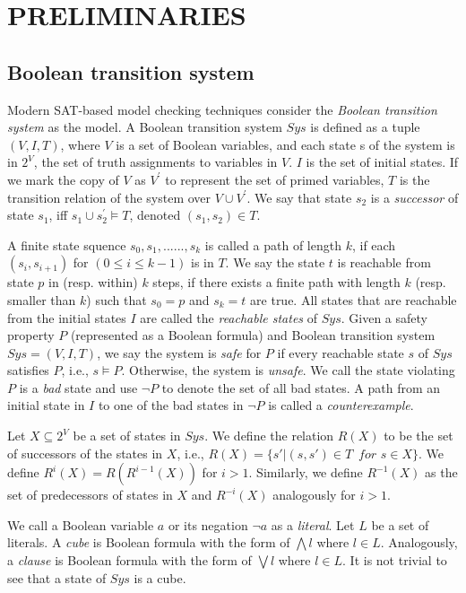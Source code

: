 \section{PRELIMINARIES}

\subsection{Boolean transition system}

Modern SAT-based model checking techniques consider the \emph{Boolean transition system} as the model. A Boolean transition system $Sys$ is defined as a tuple $(V,I,T)$, where $V$ is a set of Boolean variables, and each state s of the system is in $2^{V}$, the set of truth assignments to variables in $V$. $I$ is the set of initial states. If we mark the copy of $V$ as $V^{'}$ to represent the set of primed variables, $T$ is the transition relation of the system over $V \cup V^{'}$. We say that state $s_{2}$ is a \textit{successor} of state $s_{1}$, iff $s_{1} \cup s^{'}_{2} \models T$, denoted $(s_{1},s_{2}) \in T$.


A finite state squence $s_{0},s_{1},......,s_{k}$ is called a path of length $k$, if each $(s_{i},s_{i+1})$ for $(0 \leq i \leq k-1)$ is in $T$. We say the state $t$ is reachable from state $p$ in (resp. within) $k$ steps, if there exists a finite path with length $k$ (resp. smaller than $k$) such that $s_{0} = p$ and $s_{k} = t$ are true. All states that are reachable from the initial states $I$ are called the \emph{reachable states} of $Sys$.
Given a safety property $P$ (represented as a Boolean formula) and Boolean transition system $Sys = (V,I,T)$, we say the system is \emph{safe} for $P$ if every reachable state $s$ of $Sys$ satisfies $P$, i.e., $s\models P$. Otherwise, the system is \emph{unsafe}. We call the state violating $P$ is a \emph{bad} state and use $\neg P$ to denote the set of all bad states. A path from an initial state in $I$ to one of the bad states in $\neg P$ is called a \emph{counterexample}.

Let $X \subseteq 2^{V}$ be a set of states in $Sys$. We define the relation $R(X)$ to be the set of successors of the states in $X$, i.e.,  $R(X) = \lbrace s'|(s,s') \in T\, \textit{ for }s \in X \rbrace$. We define $R^{i}(X) = R(R^{i-1}(X))$ for $i > 1$. Similarly, we define $R^{-1}(X)$ as the set of predecessors of states in $X$ and $R^{-i}(X)$ analogously for $i > 1$.

We call a Boolean variable $a$ or its negation $\neg a$ as a \emph{literal}.
Let $L$ be a set of literals. A \emph{cube} is Boolean formula with the form of $\bigwedge l$ where $l\in L$. Analogously, a \emph{clause} is Boolean formula with the form of $\bigvee l$ where $l\in L$. It is not trivial to see that a state of $Sys$ is a cube.


